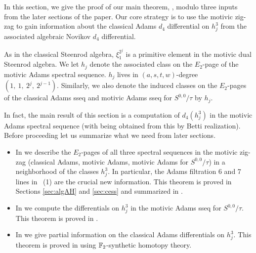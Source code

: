 In this section, we give the proof of our main theorem, , modulo three inputs from the later sections of the paper. Our core strategy is to use the motivic zig-zag to gain information about the classical Adams $d_4$ differential on $h_j^3$ from the associated algebraic Novikov $d_4$ differential.


\begin{rec}
  As in the classical Steenrod algebra, $\xi_1^{2^j}$ is a primitive element in the motivic dual Steenrod algebra. We let $h_j$ denote the associated class on the $E_2$-page of the motivic Adams spectral sequence. $h_j$ lives in $(a,s,t,w)$-degree $(1, \ 1, \ 2^j, \ 2^{j-1})$. Similarly, we also denote the induced classes on the $E_2$-pages of the classical Adams sseq and motivic Adams sseq for $S^{0,0}/\tau$ by $h_j$.
\end{rec}

In fact, the main result of this section is a computation of $d_4(h_j^3)$ in the motivic Adams spectral sequence (with  being obtained from this by Betti realization). Before proceeding let us summarize what we need from later sections.

\begin{itemize}
\item In  we describe the $E_2$-pages of all three spectral sequences in the motivic zig-zag (classical Adams, motivic Adams, motivic Adams for $S^{0,0}/\tau$) in a neighborhood of the classes $h_j^3$. In particular, the Adams filtration 6 and 7 lines in ~(1) are the crucial new information. This theorem is proved in Sections \ref{sec:algAH} and \ref{sec:cess} and summarized in .
\item In  we compute the differentials on $h_j^3$ in the motivic Adams sseq for $S^{0,0}/\tau$. This theorem is proved in .
\item In  we give partial information on the classical Adams differentials on $h_j^3$.
  This theorem is proved in  using $\operatorname{\mathbb{F}}_2$-synthetic homotopy theory.
\end{itemize}

